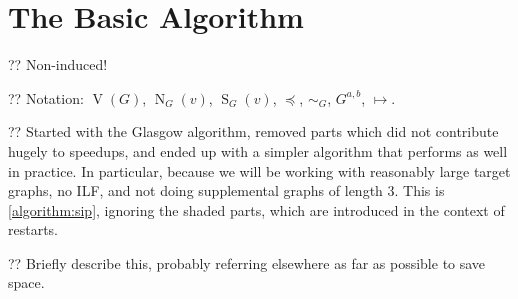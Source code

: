 \documentclass{article}
\newcommand{\neighbourhood}{\operatorname{N}}
\newcommand{\vertexset}{\operatorname{V}}
\newcommand{\nds}{\operatorname{S}}
\begin{document}
\section{The Basic Algorithm}

?? Non-induced!

?? Notation: $\vertexset(G)$, $\neighbourhood_G(v)$, $\nds_G(v)$, $\preceq$, $\sim_G$, $G^{a,b}$, $\mapsto$.

?? Started with the Glasgow algorithm, removed parts which did not contribute hugely to speedups,
and ended up with a simpler algorithm that performs as well in practice. In particular, because we
will be working with reasonably large target graphs, no ILF, and not doing supplemental graphs of
length 3. This is \cref{algorithm:sip}, ignoring the shaded parts, which are introduced in the
context of restarts.

?? Briefly describe this, probably referring elsewhere as far as possible to save space.
\end{document}
